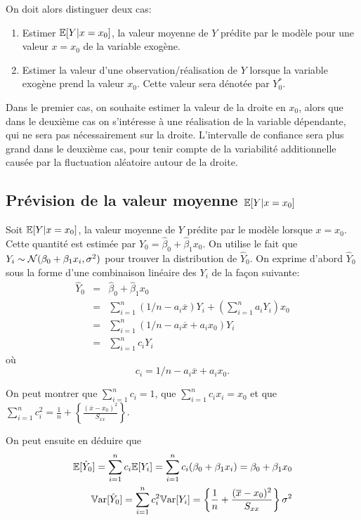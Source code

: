 On doit alors distinguer deux cas:
\begin{enumerate}
\item[(i)] Estimer $\mathbb{E}[Y|x=x_0]$, la valeur moyenne de $Y$ prédite par le modèle pour une valeur $x=x_0$
de la variable exog\`ene.
\item[(ii)] Estimer la valeur d'une observation/r\'ealisation de $Y$ lorsque
la variable exog\`ene prend la valeur $x_0$. Cette valeur sera dénotée par ${Y}_0^*$.
\end{enumerate}

Dans le premier cas, on souhaite estimer la valeur de la droite en $x_0$, alors que dans le deuxième cas on s'intéresse à une réalisation de la variable dépendante, qui ne sera pas nécessairement sur la droite. L'intervalle de confiance sera plus grand dans le deuxième cas, pour tenir compte de la variabilité additionnelle causée par la fluctuation aléatoire autour de la droite.

\subsection{Prévision de la valeur moyenne $\mathbb{E}[Y|x=x_0]$}

Soit $\mathbb{E}[Y|x=x_0]$, la valeur moyenne de $Y$ prédite par le modèle lorsque $x=x_0$. Cette quantité est estimée par $\hat{Y}_0 = \hat{\beta}_0 + \hat{\beta}_1 x_0$.
On utilise le fait que $Y_i \sim \mathcal{N}(\beta_0+\beta_1x_i,\sigma^2)$ pour trouver la distribution de $\hat{Y}_0$.
On exprime d'abord $\hat{Y}_0$ sous la forme d'une combinaison linéaire des $Y_i$ de la façon suivante:
\begin{eqnarray*}
 \hat{Y}_0 &=& \hat{\beta}_0 + \hat{\beta}_1 x_0 \\
 &=&\sum_{i=1}^n (1/n - a_i \overline{x}) Y_i + \left(\sum_{i=1}^n a_i Y_i\right) x_0 \\
 &=& \sum_{i=1}^n (1/n - a_i \overline{x} + a_i x_0) Y_i\\
 &=& \sum_{i=1}^n c_i Y_i
\end{eqnarray*}
où
 \[c_i = 1/n - a_i \overline{x} + a_i x_0.\]

On peut montrer que $\sum_{i=1}^n c_i = 1$, que $\sum_{i=1}^n c_i x_i = x_0$ et que $\sum_{i=1}^n c_i^2 = \frac{1}{n} + \left\{\frac{(\overline{x}-x_0)^2}{S_{xx}}\right\}$.

On peut ensuite en déduire que
\begin{eqnarray}
 \mathbb{E}[\hat{Y}_0]= \sum_{i=1}^n c_i \mathbb{E}[Y_i]= \sum_{i=1}^n c_i (\beta_0 + \beta_1 x_i) = \beta_0 + \beta_1 x_0 \\
 \label{eq:varyo}
 \mathbb{V}\text{ar}[\hat{Y}_0]= \sum_{i=1}^n c_i^2 \mathbb{V}\text{ar}[Y_i] = \left\{ \frac{1}{n} + \frac{(\overline{x}-x_0)^2}{S_{xx}}\right\} \sigma^2
\end{eqnarray}

